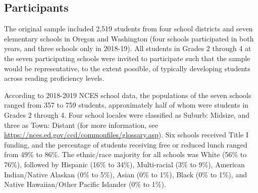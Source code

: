 \documentclass[
  english,
  man, fleqn, noextraspace]{apa6}
\begin{document}
\hypertarget{participants}{%
\subsection{Participants}\label{participants}}

The original sample included 2,519 students from four school districts and seven elementary schools in Oregon and Washington (four schools participated in both years, and three schools only in 2018-19). All students in Grades 2 through 4 at the seven participating schools were invited to participate such that the sample would be representative, to the extent possible, of typically developing students across reading proficiency levels.

According to 2018-2019 NCES school data, the populations of the seven schools ranged from 357 to 759 students, approximately half of whom were students in Grades 2 through 4. Four school locales were classified as Suburb: Midsize, and three as Town: Distant (for more information, see \url{https://nces.ed.gov/ccd/commonfiles/glossary.asp}). Six schools received Title I funding, and the percentage of students receiving free or reduced lunch ranged from 49\% to 86\%. The ethnic/race majority for all schools was White (56\% to 76\%), followed by Hispanic (16\% to 34\%), Multi-racial (3\% to 9\%), American Indian/Native Alaskan (0\% to 5\%), Asian (0\% to 1\%), Black (0\% to 1\%), and Native Hawaiian/Other Pacific Islander (0\% to 1\%).
\end{document}
